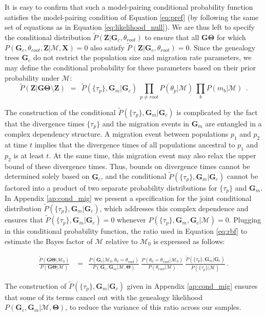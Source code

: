 \documentclass[11pt]{article}
\newcommand{\vect}[1]{\boldsymbol{\mathbf{#1}}}
\newcommand{\X}{\vect{X}}
\newcommand{\M}{\mathcal{M}}
\newcommand{\G}{\vect{G}}
\newcommand{\T}{\vect{\Theta}}
\newcommand{\GT}{\G\T}
\newcommand{\Pref}{\widetilde{P}}
\newcommand{\Z}{\vect{Z}}
\newcommand{\troot}{\theta_{root}}
\newcommand{\Gc}{\G_c}
\newcommand{\Gm}{\G_m}
\begin{document}
It is easy to confirm that such a model-pairing conditional probability function satisfies the model-pairing condition of
Equation \ref{eq:pref} (by following the same set of equations as in Equation \ref{eq:likelihood_null}).
%
We are thus left to specify the conditional distribution $\Pref(\Z|\Gc,\troot)$ to ensure that all $\GT$ for which $P(\Gc,\troot,\Z|\M,\X)=0$
also satisfy $\Pref(\Z|\Gc,\troot)=0$.
%
Since the genealogy trees $\Gc$ do not restrict the population size and migration rate parameters, we may define
the conditional probability for these parameters based on their prior probability under $\M$:
%
%
\begin{equation}
 \Pref(\Z|\GT\setminus\Z) ~~=~~ 
 \Pref(\{\tau_p\},\Gm|\Gc) \ \prod_{p\neq root} P(\theta_p|\M)\ \prod_b P(m_b|\M)\  ~.\label{eq:cond_tau_mig}
\end{equation}
%

The construction of the conditional $\Pref(\{\tau_p\},\Gm|\Gc)$ is complicated by the fact that the divergence times $\{\tau_p\}$ and the migration events in $\Gm$
are entangled in a complex dependency structure.
%
A migration event between populations $p_1$ and $p_2$ at time $t$ implies that the divergence times of all populations ancestral to $p_1$ and $p_2$ is at least $t$.
%
At the same time, this migration event may also relax the upper bound of these divergence times.
%
Thus, bounds on divergence times cannot be determined solely based on $\Gc$, and the conditional $\Pref(\{\tau_p\},\Gm|\Gc)$ cannot be factored into a product of
two separate probability distributions for $\{\tau_p\}$ and $\Gm$.
%
In Appendix \ref{ap:cond_mig} we present a specification for the joint conditional distribution $\Pref(\{\tau_p\},\Gm|\Gc)$,
which addresses this complex dependence and ensures that $\Pref(\{\tau_p\},\Gm|\Gc)=0$ whenever $P(\{\tau_p\},\Gm,\Gc|\M)=0$.
Plugging in this conditional probability function, the ratio used in Equation \ref{eq:rbf} to estimate the Bayes factor of $\M$ relative to $\M_0$ is expressed as follows:
%
%
\begin{small}
\begin{align}
\frac{\Pref(\GT|\M_0) }{P(\GT|\M)}
&=~~ \frac{ P(\Gc|\M_0,\theta_0=\troot) }{ P(\Gc,\Gm|\M,\T)}~ 
     \frac{ P(\theta_0=\troot|\M_0)}{P(\troot|\M)}~
     \frac{ \Pref(\{\tau_p\},\Gm|\Gc)}{P(\{\tau_p\}|\M)} ~. \label{eq:rbf_mig}
\end{align}
\end{small}

The construction of $\Pref(\{\tau_p\},\Gm|\Gc)$ given in Appendix \ref{ap:cond_mig} ensures that some of its terms cancel out with the genealogy likelihood
$P(\Gc,\Gm|\M,\T)$, to reduce the variance of this ratio across our samples.
\end{document}
